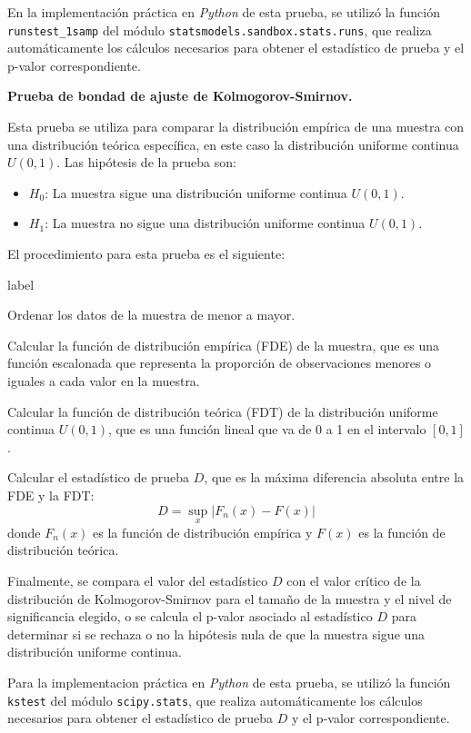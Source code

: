 \documentclass{article}
\begin{document}
En la implementación práctica en \textit{Python} de esta prueba, se utilizó la función \texttt{runstest\_1samp} del módulo \texttt{statsmodels.sandbox.stats.runs}, que realiza automáticamente los cálculos necesarios para obtener el estadístico de prueba y el p-valor correspondiente.


\textbf{Prueba de bondad de ajuste de Kolmogorov-Smirnov.}

Esta prueba se utiliza para comparar la distribución empírica de una muestra con una distribución teórica específica, en este caso la distribución uniforme continua $U(0, 1)$.
Las hipótesis de la prueba son:
\begin{itemize}
  \item $H_0$: La muestra sigue una distribución uniforme continua $U(0, 1)$.
  \item $H_1$: La muestra no sigue una distribución uniforme continua $U(0, 1)$.
\end{itemize}
El procedimiento para esta prueba es el siguiente:
\begin{list}{label}{}
  \item [1.] Ordenar los datos de la muestra de menor a mayor.
  \item [2.] Calcular la función de distribución empírica (FDE) de la muestra, que es una función escalonada que representa la proporción de observaciones menores o iguales a cada valor en la muestra.
  \item [3.] Calcular la función de distribución teórica (FDT) de la distribución uniforme continua $U(0, 1)$, que es una función lineal que va de 0 a 1 en el intervalo $[0, 1]$.
  \item [4.] Calcular el estadístico de prueba $D$, que es la máxima diferencia absoluta entre la FDE y la FDT:
        $$D = \sup_x |F_n(x) - F(x)|$$
        donde $F_n(x)$ es la función de distribución empírica y $F(x)$ es la función de distribución teórica.
\end{list}
Finalmente, se compara el valor del estadístico $D$ con el valor crítico de la distribución de Kolmogorov-Smirnov para el tamaño de la muestra y el nivel de significancia elegido, o se calcula el p-valor asociado al estadístico $D$ para determinar si se rechaza o no la hipótesis nula de que la muestra sigue una distribución uniforme continua.

Para la implementacion práctica en \textit{Python} de esta prueba, se utilizó la función \texttt{kstest} del módulo \texttt{scipy.stats}, que realiza automáticamente los cálculos necesarios para obtener el estadístico de prueba $D$ y el p-valor correspondiente.
\end{document}

